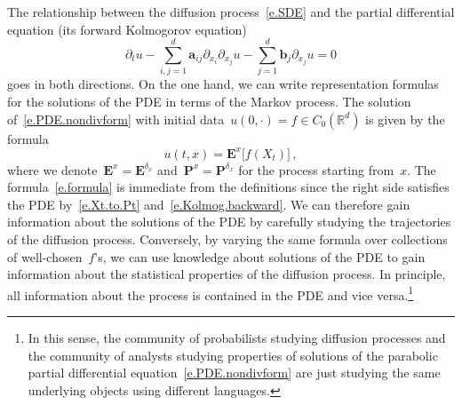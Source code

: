 \documentclass[11pt,twoside]{article} %
\numberwithin{equation}{section}
\theoremstyle{definition}
\newcommand*{\Rd}{\ensuremath{\mathbb{R}^d}}
\renewcommand{\b}{\ensuremath{\mathbf{b}}}
\renewcommand{\a}{\mathbf{a}}
\begin{document}
The relationship between the diffusion process~\eqref{e.SDE} and the partial differential equation (its forward Kolmogorov equation)
\begin{equation}
\label{e.PDE.nondivform}
\partial_t u - \sum_{i,j=1}^d \a_{ij} \partial_{x_i} \partial_{x_j} u
-
\sum_{j=1}^d \b_j \partial_{x_j} u = 0 
\end{equation}
goes in both directions. On the one hand, we can write representation formulas for the solutions of the PDE in terms of the Markov process. The solution of~\eqref{e.PDE.nondivform} with initial data~$u(0,\cdot) = f \in C_0(\Rd)$ is given by the formula
\begin{equation}
\label{e.formula}
u(t,x) 
=
\mathbf{E}^x 
\bigl[
f( X_t) 
\bigr]
\,,
\end{equation}
where we denote~$\mathbf{E}^x=\mathbf{E}^{\delta_x}$ and~$\mathbf{P}^x=\mathbf{P}^{\delta_x}$ for the process starting from~$x$. 
The formula~\eqref{e.formula} is immediate from the definitions since the right side satisfies the PDE by~\eqref{e.Xt.to.Pt} and~\eqref{e.Kolmog.backward}. 
We can therefore gain information about the solutions of the PDE by carefully studying the trajectories of the diffusion process. 
Conversely, by varying the same formula over collections of well-chosen~$f$'s, we can use knowledge about solutions of the PDE to gain information about the statistical properties of the diffusion process. In principle, all information about the process is contained in the PDE and vice versa.\footnote{In this sense, the community of probabilists studying diffusion processes and the community of analysts studying properties of solutions of the parabolic partial differential equation~\eqref{e.PDE.nondivform} are just studying the same underlying objects using different languages.} 

\smallskip
\end{document}
